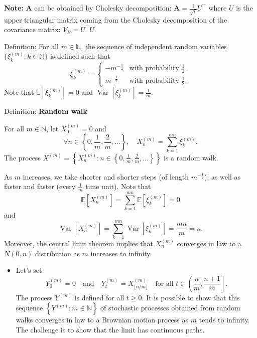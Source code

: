 \documentclass[12pt,a4paper]{article}
\begin{document}
\vspace{1em}

\textbf{Note:} $\mathbf{A}$ can be obtained by Cholesky decomposition: $\mathbf{A}= \frac{1}{\sqrt{t}}U^{\top}$ where $U$ is the upper triangular matrix coming from the Cholesky decomposition of the covariance matrix: $V_B=U^{\top}U$.

\vspace{1em}
Definition: For all $m \in \mathbb{N}$, the sequence of independent random variables $\{\xi_k^{(m)} : k \in \mathbb{N}\}$ is defined such that
\[
\xi_k^{(m)} = \begin{cases} -m^{-\frac{1}{2}} & \text{with probability } \frac{1}{2}, \\ m^{-\frac{1}{2}} & \text{with probability } \frac{1}{2}. \end{cases}
\]
Note that $\mathbb{E}\left[\xi_k^{(m)}\right] = 0$ and $\operatorname{Var}\left[\xi_k^{(m)}\right] = \frac{1}{m}$.
\vspace{1em}

Definition: \textbf{Random walk}
\vspace{0.5em}

For all $m \in \mathbb{N}$, let $X_0^{(m)} = 0$ and
\[
\forall n \in \left\{0, \frac{1}{m}, \frac{2}{m}, \ldots \right\}, \quad X_n^{(m)} = \sum_{k=1}^{mn} \xi_k^{(m)}.
\]
The process $X^{(m)} = \left\{X_n^{(m)} : n \in \left\{0, \frac{1}{m}, \frac{2}{m}, \ldots \right\}\right\}$ is a random walk.
\vspace{1em}

As $m$ increases, we take shorter and shorter steps (of length $m^{-\frac{1}{2}}$), as well as faster and faster (every $\frac{1}{m}$ time unit). Note that
\[
\mathbb{E}\left[X_n^{(m)}\right] = \sum_{k=1}^{mn} \mathbb{E}\left[\xi_k^{(m)}\right] = 0
\]
and
\[
\operatorname{Var}\left[X_n^{(m)}\right] = \sum_{k=1}^{mn} \operatorname{Var}\left[\xi_k^{(m)}\right] = \frac{mn}{m} = n.
\]
Moreover, the central limit theorem implies that $X_n^{(m)}$ converges in law to a $N(0, n)$ distribution as $m$ increases to infinity.
\vspace{1em}

\begin{itemize}
	\item Let's set
	\[
	Y_0^{(m)} = 0 \quad \text{and} \quad Y_t^{(m)} = X_{\lfloor n/m \rfloor}^{(m)} \quad \text{for all } t \in \left(\frac{n}{m}, \frac{n+1}{m}\right].
	\]
	The process $Y^{(m)}$ is defined for all $t \geq 0$. It is possible to show that this sequence $\left\{ Y^{(m)} : m \in \mathbb{N} \right\}$ of stochastic processes obtained from random walks converges in law to a Brownian motion process as $m$ tends to infinity. The challenge is to show that the limit has continuous paths.
\end{itemize}
\vspace{1em}
\end{document}
